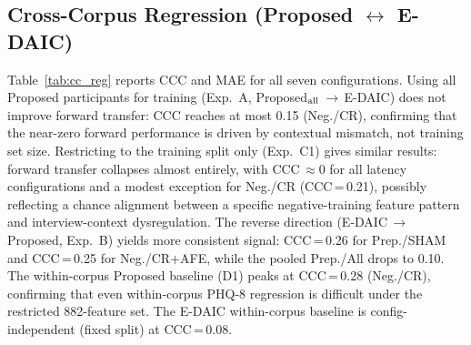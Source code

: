 \documentclass[sigconf]{acmart}
\begin{document}
\subsection{Cross-Corpus Regression (Proposed $\leftrightarrow$ E-DAIC)}
\label{sec:results_cross}

Table~\ref{tab:cc_reg} reports CCC and MAE for all seven configurations.
Using all Proposed participants for training (Exp.~A, Proposed$_{\rm all}$\,$\to$\,E-DAIC)
does not improve forward transfer: CCC reaches at most 0.15 (Neg./CR), confirming that
the near-zero forward performance is driven by contextual mismatch, not training set size.
Restricting to the training split only (Exp.~C1) gives similar results: forward transfer
collapses almost entirely, with CCC\,$\approx 0$ for all latency configurations and
a modest exception for Neg./CR (CCC\,=\,0.21), possibly reflecting a chance alignment
between a specific negative-training feature pattern and interview-context dysregulation.
The reverse direction (E-DAIC\,$\to$\,Proposed, Exp.~B) yields more consistent signal:
CCC\,=\,0.26 for Prep./SHAM and CCC\,=\,0.25 for Neg./CR+AFE, while the pooled
Prep./All drops to 0.10. The within-corpus Proposed baseline (D1) peaks at CCC\,=\,0.28
(Neg./CR), confirming that even within-corpus PHQ-8 regression is difficult under
the restricted 882-feature set.
The E-DAIC within-corpus baseline is config-independent (fixed split) at CCC\,=\,0.08.
\end{document}
